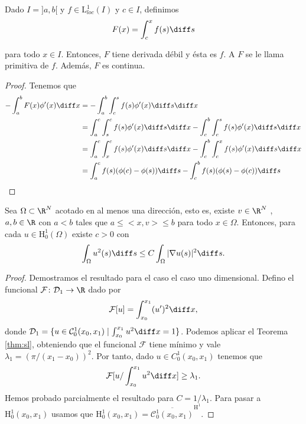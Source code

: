 \documentclass{article}
\begin{document}
\begin{theorem}
  \label{thm:fundamental-calculo}
  Dado $I = ]a,b[$ y $f \in \mathrm{L}_{loc}^1(I)$ y $c \in I$, definimos
  \[ F(x) = \int_c^x f(s) \diff s \]

  para todo $x \in I$. Entonces, $F$ tiene derivada débil y ésta es $f$. A $F$ se le llama primitiva
  de $f$. Además, $F$ es continua.
\end{theorem}
\begin{proof}
  Tenemos que
  \begin{align*}
    - \int_a^b F(x) \phi'(x) \diff x & = - \int_a^b \int_{c}^{s} f(s) \phi'(x) \diff s \diff x \\
                                     & =  \int_a^c \int_{s}^{c} f(s) \phi'(x) \diff s \diff x - \int_c^b \int_{c}^{s} f(s) \phi'(x) \diff s \diff x \\
                                     & =  \int_a^c \int_{x}^{c} f(s) \phi'(x) \diff s \diff x - \int_c^b \int_{c}^{x} f(s) \phi'(x) \diff s \diff x \\
                                     & =  \int_a^c f(s) (\phi(c)-\phi(s)) \diff s - \int_c^b  f(s) (\phi(s) - \phi(c)) \diff s  
  \end{align*}
\end{proof}

\begin{theorem}[Poincaré]
  \label{thm:cota-h1}
  Sea $\Omega \subset \R^N$ acotado en al menos una dirección, esto es, existe $v \in \R^N$ ,
  $a,b \in \R$ con $a < b$ tales que $a \le <x,v> \le b$ para todo $x \in \Omega$. Entonces, para
  cada $u \in \mathrm{H}_0^1(\Omega)$ existe $c > 0$ con
  \[ \int_{\Omega} u^2(s) \diff s \le C \int_{\Omega} |\nabla u(s)|^2 \diff s.\]
\end{theorem}
\begin{proof}
  Demostramos el resultado para el caso el caso uno dimensional.  Defino el funcional
  $\mathcal{F}\colon \mathcal{D}_1 \to \R$ dado por
  \[ \mathcal{F}[u] = \int_{x_0}^{x_1} (u')^2 \diff x, \] donde
  $\mathcal{D}_1 = \{u \in \mathcal{C}_0^1(x_0,x_1) \mid \int_{x_0}^{x_1} u^2 \diff x =
  1\}$. Podemos aplicar el Teorema \eqref{thm:sl}, obteniendo que el funcional $\mathcal{F}$ tiene
  mínimo y vale $\lambda_1 = (\pi / (x_1-x_0))^2$. Por tanto, dado $u \in C_0^1(x_0, x_1)$ tenemos
  que
  \[\mathcal{F}[u / \int_{x_0}^{x_1} u^2 \diff x] \ge \lambda_1.\]
  Hemos probado parcialmente el resultado para $C = 1 / \lambda_1$. Para pasar a
  $\mathrm{H}_0^1(x_0, x_1)$ usamos que
  $\mathrm{H}_0^1(x_0, x_1) = \overline{\mathcal{C}_0^1(x_0, x_1)}^{\mathrm{H}^1}$.
\end{proof}
\end{document}
